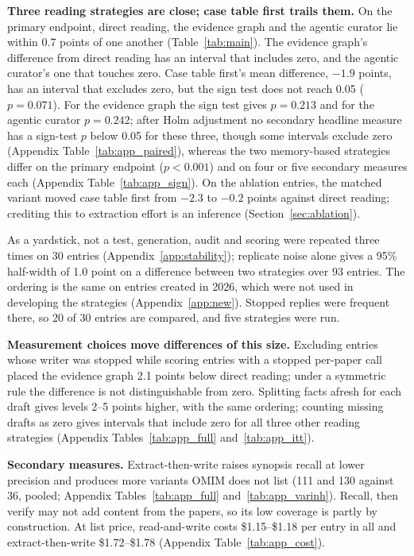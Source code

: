 \documentclass{article} %
\begin{document}
\textbf{Three reading strategies are close; case table first trails them.} On the primary endpoint, direct reading, the evidence graph and the agentic curator lie within 0.7 points of one another (Table~\ref{tab:main}). The evidence graph's difference from direct reading has an interval that includes zero, and the agentic curator's one that touches zero. Case table first's mean difference, $-1.9$ points, has an interval that excludes zero, but the sign test does not reach 0.05 ($p=0.071$). For the evidence graph the sign test gives $p=0.213$ and for the agentic curator $p=0.242$; after Holm adjustment no secondary headline measure has a sign-test $p$ below 0.05 for these three, though some intervals exclude zero (Appendix Table~\ref{tab:app_paired}), whereas the two memory-based strategies differ on the primary endpoint ($p<0.001$) and on four or five secondary measures each (Appendix Table~\ref{tab:app_sign}). On the ablation entries, the matched variant moved case table first from $-2.3$ to $-0.2$ points against direct reading; crediting this to extraction effort is an inference (Section~\ref{sec:ablation}).

As a yardstick, not a test, generation, audit and scoring were repeated three times on 30 entries (Appendix~\ref{app:stability}); replicate noise alone gives a 95\% half-width of 1.0 point on a difference between two strategies over 93 entries. The ordering is the same on entries created in 2026, which were not used in developing the strategies (Appendix~\ref{app:new}). Stopped replies were frequent there, so 20 of 30 entries are compared, and five strategies were run.

\textbf{Measurement choices move differences of this size.} Excluding entries whose writer was stopped while scoring entries with a stopped per-paper call placed the evidence graph 2.1 points below direct reading; under a symmetric rule the difference is not distinguishable from zero. Splitting facts afresh for each draft gives levels 2--5 points higher, with the same ordering; counting missing drafts as zero gives intervals that include zero for all three other reading strategies (Appendix Tables~\ref{tab:app_full} and~\ref{tab:app_itt}).

\textbf{Secondary measures.} Extract-then-write raises synopsis recall at lower precision and produces more variants OMIM does not list (111 and 130 against 36, pooled; Appendix Tables~\ref{tab:app_full} and~\ref{tab:app_varinh}). Recall, then verify may not add content from the papers, so its low coverage is partly by construction. At list price, read-and-write costs \$1.15--\$1.18 per entry in all and extract-then-write \$1.72--\$1.78 (Appendix Table~\ref{tab:app_cost}).
\end{document}
